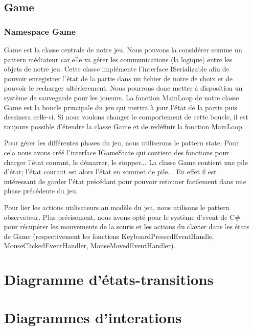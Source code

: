 	\subsection{Game}	
		\subsubsection{Namespace Game}
				Game est la classe centrale de notre jeu. 
				Nous pouvons la considérer comme un pattern médiateur car elle va gérer les communications (la logique) entre les objets de notre jeu.
			Cette classe implémente l'interface ISerializable afin de pouvoir enregistrer l'état de la partie dans un fichier de notre de choix et de pouvoir le recharger
			ultérierement. Nous pourrons donc mettre à disposition un système de sauvegarde pour les joueurs. 
			La fonction MainLoop de notre classe Game est la boucle principale du jeu qui mettra à jour l'état de la partie puis dessinera celle-ci. 
			Si nous voulons changer le comportement de cette boucle, il est toujours possible d'étendre la classe Game et de redéfinir la fonction MainLoop.

				Pour gérer les différentes phases du jeu, nous utiliserons le pattern state. 
			Pour cela nous avons créé l'interface IGameState qui contient des fonctions pour charger l'état courant, le démarrer, le stopper...
			La classe Game contient une pile d'état; l'état courant est alors l'état en sommet de pile. .
			En effet il est intéressant de garder l'état précédant pour pouvoir retouner facilement dans une phase précédente du jeu.

				Pour lier les actions utilisateurs au modèle du jeu, nous utilisons le pattern observateur. Plus précisement, nous avons opté pour le système d'event de C\#
			pour récupérer les mouvements de la souris et les actions du clavier dans les états de Game (respectivement les fonctions KeyboardPressedEventHandle,  MouseClickedEventHandler, MouseMovedEventHandler).
			
\section{Diagramme d'états-transitions}
	

\section{Diagrammes d'interations}

